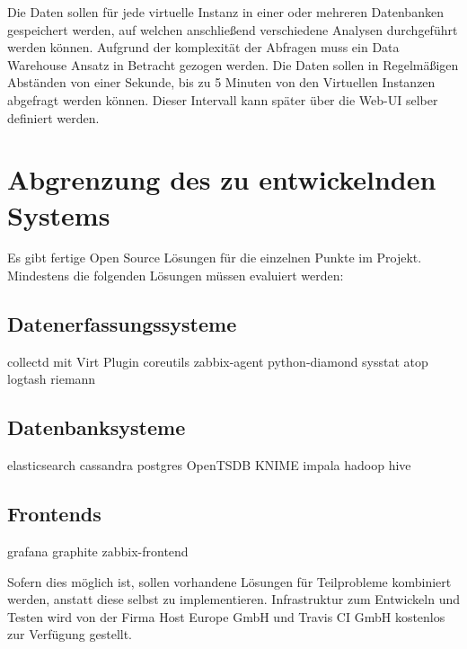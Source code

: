 Die Daten sollen für jede virtuelle Instanz in einer oder mehreren Datenbanken
gespeichert werden, auf welchen anschließend verschiedene Analysen
durchgeführt werden können. Aufgrund der komplexität der Abfragen muss ein
Data Warehouse Ansatz in Betracht gezogen werden. Die Daten sollen in
Regelmäßigen Abständen von einer Sekunde, bis zu 5 Minuten von den Virtuellen
Instanzen abgefragt werden können. Dieser Intervall kann später über die
Web-UI selber definiert werden.

\section{Abgrenzung des zu entwickelnden Systems}

Es gibt fertige Open Source Lösungen für die einzelnen Punkte im Projekt.
Mindestens die folgenden Lösungen müssen evaluiert werden:

\subsection{Datenerfassungssysteme}

\begin{outline}
  \1 collectd mit Virt Plugin
  \1 coreutils
  \1 zabbix-agent
  \1 python-diamond
  \1 sysstat
  \1 atop
  \1 logtash
  \1 riemann
\end{outline}

\subsection{Datenbanksysteme}

\begin{outline}
  \1 elasticsearch
  \1 cassandra
  \1 postgres
  \1 OpenTSDB
  \1 KNIME
  \1 impala
  \1 hadoop
  \1 hive
\end{outline}

\subsection{Frontends}

\begin{outline}
  \1 grafana
  \1 graphite
  \1 zabbix-frontend
\end{outline}

Sofern dies möglich ist, sollen vorhandene Lösungen für Teilprobleme
kombiniert werden, anstatt diese selbst zu implementieren. Infrastruktur zum
Entwickeln und Testen wird von der Firma Host Europe GmbH und Travis CI GmbH
kostenlos zur Verfügung gestellt.

